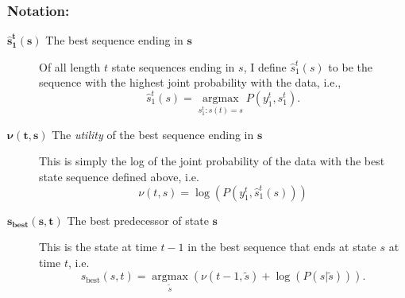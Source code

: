 \documentclass[]{article}
\newcommand{\ts}[3]{#1_{#2}^{#3}}                    %
\newcommand{\argmax}{\operatorname*{argmax}}
\newcommand{\ti}[2]{{#1}{(#2)}}                  %
\newcommand{\ie}{i.e.\xspace}
\newcommand{\sbest}{s_{\text{best}}}
\begin{document}
\subsubsection*{Notation:}
\begin{description}
\item[$\bm{{\hat s}_1^t(s)}$ The best sequence ending in $\bm{s}$]
  Of all length $t$ state sequences ending in $s$, I define
  $\ts{\hat s}{1}{t}(s)$ to be the sequence with the highest joint
  probability with the data, \ie,
  \begin{equation*}
    \ts{\hat s}{1}{t}(s) = \argmax_{ \ts{s}{1}{t}:\ti{s}{t}=s}
    P\left(\ts{y}{1}{t}, \ts{s}{1}{t} \right).
  \end{equation*}
\item[$\bm{\nu(t,s)}$ The \emph{utility} of the best sequence ending
  in $\bm{s}$] %
  This is simply the log of the joint
  probability of the data with the best state sequence defined above,
  \ie
  \begin{equation*}
    \nu(t,s) = \log\left( P\left(\ts{y}{1}{t}, \ts{\hat s}{1}{t}(s)
      \right) \right)
  \end{equation*}
\item[$\bm{\sbest(s,t)}$ The best predecessor of state $\bm{s}$] This is
  the state at time $t-1$ in the best sequence that ends at state $s$
  at time $t$, \ie
  \begin{equation*}
    \sbest(s,t) = \argmax_{\tilde s} \left( \nu(t-1,\tilde s) + \log(
      P(s|\tilde s)) \right).
  \end{equation*}
\end{description}
\end{document}
